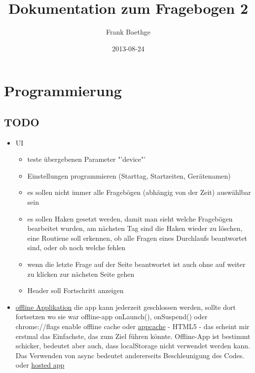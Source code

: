 \documentclass[a4paper]{scrartcl}
\title{Dokumentation zum Fragebogen 2}
\author{Frank Baethge}
\date{2013-08-24}
\begin{document}
	\section{Programmierung}

		\subsection{TODO}
			\begin{itemize}
				\item UI

					\begin{itemize}
						\item teste übergebenen Parameter "'device"'
						\item Einstellungen programmieren (Starttag, Startzeiten, Gerätenamen)
						\item es sollen nicht immer alle Fragebögen (abhängig von der Zeit) auswählbar sein
						\item es sollen Haken gesetzt werden, damit man sieht welche Fragebögen bearbeitet wurden, am nächsten Tag sind die Haken wieder zu löschen, eine Routiene soll erkennen, ob alle Fragen eines Durchlaufs beantwortet sind, oder ob noch welche fehlen
						\item wenn die letzte Frage auf der Seite beantwortet ist auch ohne auf weiter zu klicken zur nächsten Seite gehen
						\item Header soll Fortschritt anzeigen
					\end{itemize}
				\item \href{http://developer.chrome.com/apps}{offline Applikation}\newline
					die app kann jederzeit geschlossen werden, sollte dort fortsetzen wo sie war\newline
					offline-app onLaunch(), onSuspend()\newline
					oder chrome://flags enable offline cache\newline
					oder \href{http://appcachefacts.info/}{appcache} - HTML5 - das scheint mir erstmal das Einfachste, das zum Ziel führen könnte. Offline-App ist bestimmt schicker, bedeutet aber auch, dass localStorage nicht verwendet werden kann. Das Verwenden von async bedeutet andererseits Beschleunigung des Codes.
					oder \href{https://developers.google.com/chrome/apps/docs/developers_guide?csw=1}{hosted app}

\end{itemize}
\end{document}
